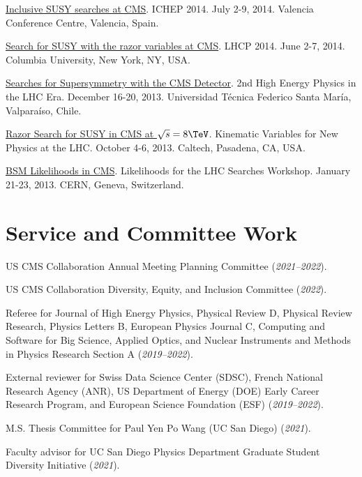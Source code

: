 \documentclass{res}
\newcommand{\MarginText}[1]{\section{#1}\vspace{10pt}}
\begin{document}
\begin{resume}
{  \href{https://indico.ific.uv.es/indico/contributionDisplay.py?sessionId=24&contribId=289&confId=2025}{Inclusive SUSY searches at CMS}. ICHEP 2014. July 2-9, 2014. Valencia Conference Centre, Valencia, Spain.

  \href{https://indico.cern.ch/event/279518/contributions/634785/}{Search for SUSY with the razor variables at CMS}. LHCP 2014. June 2-7, 2014. Columbia University, New York, NY, USA.

  \href{https://indico.cern.ch/event/252857/contributions/1579321/}{Searches for Supersymmetry with the CMS Detector}. 2nd High Energy Physics in the LHC Era. December 16-20, 2013. Universidad T\'{e}cnica Federico Santa Mar\'{i}a, Valpara\'{i}so, Chile.

  \href{https://indico.cern.ch/event/261650/contributions/586374/}{Razor Search for SUSY in CMS at $\sqrt{s}=8\TeV$}. Kinematic Variables for New Physics at the LHC. October 4-6, 2013. Caltech, Pasadena, CA, USA.

  \href{https://indico.cern.ch/event/218693/contributions/1520333/}{BSM Likelihoods in CMS}. Likelihoods for the LHC Searches Workshop. January 21-23, 2013. CERN, Geneva, Switzerland.

  }{}


  \MarginText{Service and Committee Work}

  US CMS Collaboration Annual Meeting Planning Committee (\textit{2021--2022}).

  US CMS Collaboration Diversity, Equity, and Inclusion Committee (\textit{2022}).

  Referee for Journal of High Energy Physics, Physical Review D, Physical Review Research, Physics Letters B, European Physics Journal C, Computing and Software for Big Science, Applied Optics, and Nuclear Instruments and Methods in Physics Research Section A (\textit{2019--2022}).

  External reviewer for Swiss Data Science Center (SDSC), French National Research Agency (ANR), US Department of Energy (DOE) Early Career Research Program, and European Science Foundation (ESF) (\textit{2019--2022}).

  M.S. Thesis Committee for Paul Yen Po Wang (UC San Diego) (\textit{2021}).

  Faculty advisor for UC San Diego Physics Department Graduate Student Diversity Initiative (\textit{2021}).


\end{resume}
\end{document}
